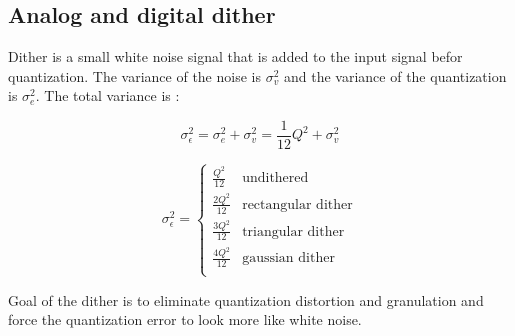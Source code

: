 \subsection{Analog and digital dither}
Dither is a small white noise signal that is added to the input signal befor quantization. The variance of the noise is $\sigma_v^2$ and the variance of the quantization is $\sigma_e^2$. The total variance is :

\[ \sigma_{\epsilon}^2 = \sigma_e^2 + \sigma_v^2 =\frac{1}{12}Q^2+\sigma_v^2\]

\begin{equation*}
	\sigma_{\epsilon}^2 = 
	\begin{cases}
		\frac{Q^2}{12} & \text{undithered} \\
		\frac{2Q^2}{12} & \text{rectangular dither} \\
		\frac{3Q^2}{12} & \text{triangular dither} \\
		\frac{4Q^2}{12} & \text{gaussian dither} \\
	\end{cases}
\end{equation*}

Goal of the dither is to eliminate quantization distortion and granulation and force the quantization error to look more
like white noise.
